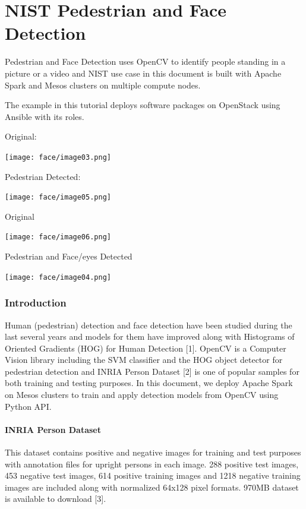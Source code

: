 \chapter{NIST Pedestrian and Face Detection}

Pedestrian and Face Detection uses OpenCV to identify people standing in
a picture or a video and NIST use case in this document is built with
Apache Spark and Mesos clusters on multiple compute nodes.

The example in this tutorial deploys software packages on OpenStack
using Ansible with its roles.


Original:

\texttt{[image: face/image03.png]}

Pedestrian Detected:

\texttt{[image: face/image05.png]}

Original

\texttt{[image: face/image06.png]}

Pedestrian and Face/eyes Detected

\texttt{[image: face/image04.png]}

\subsection{Introduction}\label{introduction}

Human (pedestrian) detection and face detection have been studied during
the last several years and models for them have improved along with
Histograms of Oriented Gradients (HOG) for Human Detection {[}1{]}.
OpenCV is a Computer Vision library including the SVM classifier and the
HOG object detector for pedestrian detection and INRIA Person Dataset
{[}2{]} is one of popular samples for both training and testing
purposes. In this document, we deploy Apache Spark on Mesos clusters to
train and apply detection models from OpenCV using Python API.

\subsubsection{INRIA Person Dataset}\label{inria-person-dataset}

This dataset contains positive and negative images for training and test
purposes with annotation files for upright persons in each image. 288
positive test images, 453 negative test images, 614 positive training
images and 1218 negative training images are included along with
normalized 64x128 pixel formats. 970MB dataset is available to download
{[}3{]}.

